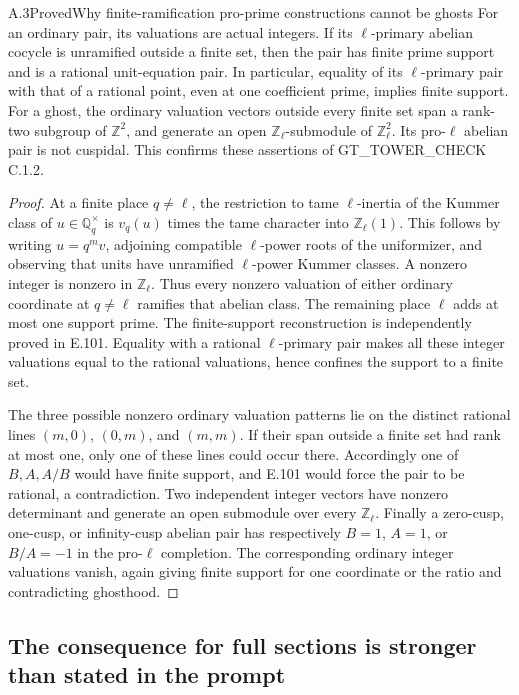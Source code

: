 \begin{result}{A.3}{Proved}{Why finite-ramification pro-prime constructions cannot be ghosts}
For an ordinary pair, its valuations are actual integers. If its
\(\ell\)-primary abelian cocycle is unramified outside a finite set,
then the pair has finite prime support and is a rational unit-equation
pair. In particular, equality of its \(\ell\)-primary pair with that
of a rational point, even at one coefficient prime, implies finite support.
For a ghost, the ordinary valuation vectors outside every finite set
span a rank-two subgroup of \(\mathbb Z^2\), and generate an open
\(\mathbb Z_\ell\)-submodule of \(\mathbb Z_\ell^2\).
Its pro-\(\ell\) abelian pair is not cuspidal.
This confirms these assertions of GT\_TOWER\_CHECK C.1.2.
\end{result}
\begin{proof}
At a finite place \(q\ne\ell\), the restriction to tame
\(\ell\)-inertia of the Kummer class of \(u\in\mathbb Q_q^\times\)
is \(v_q(u)\) times the tame character into \(\mathbb Z_\ell(1)\).
This follows by writing \(u=q^m v\), adjoining compatible
\(\ell\)-power roots of the uniformizer, and observing that units have
unramified \(\ell\)-power Kummer classes. A nonzero integer is nonzero
in \(\mathbb Z_\ell\). Thus every nonzero valuation of either ordinary
coordinate at \(q\ne\ell\) ramifies that abelian class. The remaining
place \(\ell\) adds at most one support prime. The finite-support
reconstruction is independently proved in E.101. Equality with a rational
\(\ell\)-primary pair makes all these integer valuations equal to the
rational valuations, hence confines the support to a finite set.

The three possible nonzero ordinary valuation patterns lie on the
distinct rational lines \((m,0)\), \((0,m)\), and \((m,m)\).
If their span outside a finite set had rank at most one, only one of
these lines could occur there. Accordingly one of \(B,A,A/B\)
would have finite support, and E.101 would force the pair to be
rational, a contradiction. Two independent integer vectors have
nonzero determinant and generate an open submodule over every
\(\mathbb Z_\ell\). Finally a zero-cusp, one-cusp, or infinity-cusp
abelian pair has respectively \(B=1\), \(A=1\), or \(B/A=-1\)
in the pro-\(\ell\) completion. The corresponding ordinary
integer valuations vanish, again giving finite support for one
coordinate or the ratio and contradicting ghosthood.
\end{proof}

\subsection{The consequence for full sections is stronger than stated in the prompt}

